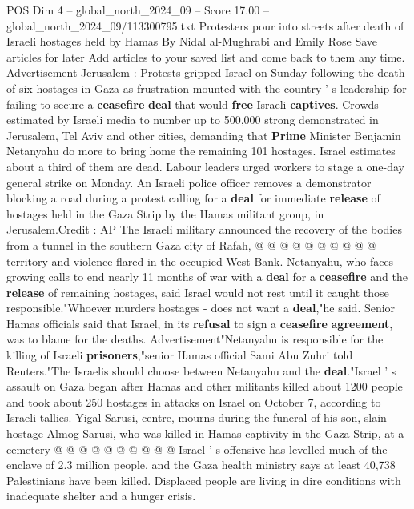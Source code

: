 \begin{textsample}{POS Dim 4 – global\_north\_2024\_09 – Score 17.00 – global\_north\_2024\_09/113300795.txt}  \label{ex:f4_pos_330}
Protesters pour into streets after death of Israeli hostages held by Hamas By Nidal al-Mughrabi and Emily Rose Save articles for later Add articles to your saved list and come back to them any time.
Advertisement Jerusalem : Protests gripped Israel on Sunday following the death of six hostages in Gaza as frustration mounted with the country ' s leadership for failing to secure a \textbf{ceasefire} \textbf{deal} that would \textbf{free} Israeli \textbf{captives}.
Crowds estimated by Israeli media to number up to 500,000 strong demonstrated in Jerusalem, Tel Aviv and other cities, demanding that \textbf{Prime} Minister Benjamin Netanyahu do more to bring home the remaining 101 hostages.
Israel estimates about a third of them are dead.
Labour leaders urged workers to stage a one-day general strike on Monday.
An Israeli police officer removes a demonstrator blocking a road during a protest calling for a \textbf{deal} for immediate \textbf{release} of hostages held in the Gaza Strip by the Hamas militant group, in Jerusalem.Credit : AP The Israeli military announced the recovery of the bodies from a tunnel in the southern Gaza city of Rafah, @ @ @ @ @ @ @ @ @ @ territory and violence flared in the occupied West Bank.
Netanyahu, who faces growing calls to end nearly 11 months of war with a \textbf{deal} for a \textbf{ceasefire} and the \textbf{release} of remaining hostages, said Israel would not rest until it caught those responsible."Whoever murders hostages - does not want a \textbf{deal},"he said.
Senior Hamas officials said that Israel, in its \textbf{refusal} to sign a \textbf{ceasefire} \textbf{agreement}, was to blame for the deaths.
Advertisement"Netanyahu is responsible for the killing of Israeli \textbf{prisoners},"senior Hamas official Sami Abu Zuhri told Reuters."The Israelis should choose between Netanyahu and the \textbf{deal}."Israel ' s assault on Gaza began after Hamas and other militants killed about 1200 people and took about 250 hostages in attacks on Israel on October 7, according to Israeli tallies.
Yigal Sarusi, centre, mourns during the funeral of his son, slain hostage Almog Sarusi, who was killed in Hamas captivity in the Gaza Strip, at a cemetery @ @ @ @ @ @ @ @ @ @ Israel ' s offensive has levelled much of the enclave of 2.3 million people, and the Gaza health ministry says at least 40,738 Palestinians have been killed.
Displaced people are living in dire conditions with inadequate shelter and a hunger crisis.

\end{textsample}
